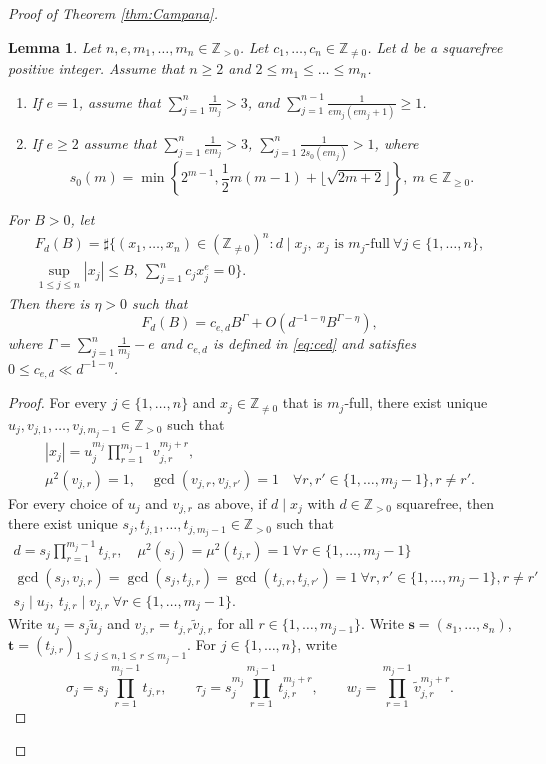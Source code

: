 \documentclass[10pt, a4paper, reqno, english]{amsart}
\newcommand\ZZ{\mathbb{Z}}
\newtheorem{lemma}[theorem]{Lemma}
\theoremstyle{definition}
\numberwithin{theorem}{section}
\numberwithin{equation}{section}
\begin{document}
\begin{proof}[Proof of Theorem \ref{thm:Campana}]
\begin{lemma}\label{lem:diagonal}
Let $n,e, m_1,\dots,m_n\in\ZZ_{>0}$. Let $c_1,\dots,c_n\in\ZZ_{\neq 0}$. Let $d$ be a squarefree positive integer. 
Assume that $n\geq 2$ and $2\leq m_1\leq \dots\leq m_n$.
\begin{enumerate}
\item If $e=1$, assume that $\sum_{j=1}^n\frac 1{m_j}>3$, and $\sum_{j=1}^{n-1}\frac 1{em_j(em_j+1)}\geq 1$. 
\item If $e\geq 2$ assume that $\sum_{j=1}^n\frac 1{em_j}>3$, $\sum_{j=1}^n\frac 1{2s_0(em_j)}>1$, where
$$
s_0(m)=\min\left\{2^{m-1},\frac 12m(m-1)+\lfloor\sqrt{2m+2}\rfloor\right\}, \ m\in\ZZ_{\geq0}.
$$
\end{enumerate}
For $B>0$, let
\begin{multline*}F_{d}(B)=\sharp\{(x_{1},\dots,x_{n})\in(\ZZ_{\neq 0})^{n}: 
	 d\mid x_{j}, \ 
	 x_{j} \text{ is } m_{j}\text{-full} \ \forall j\in\{1,\dots,n\}, \\
	 \sup_{1\leq j\leq n}|x_{j}|\leq B, \
	  \sum_{j=1}^{n} c_{j}x_{j}^{e}=0\}.
\end{multline*}
Then there is $\eta>0$ such that 
$$
F_{d}(B)=c_{e,d}B^\Gamma +O(d^{-1-\eta}B^{\Gamma-\eta}),
$$
where $\Gamma=\sum_{j=1}^n\frac 1{m_j}-e$ and $c_{e,d}$ is defined in \eqref{eq:ced} and satisfies $0\leq c_{e,d}\ll d^{-1-\eta}$.
\end{lemma}
\begin{proof}
For every $j\in\{1,\dots,n\}$ and $x_j\in\ZZ_{\neq 0}$ that is $m_j$-full,
there exist unique $u_j,v_{j,1},\dots,v_{j,m_j-1}\in\ZZ_{>0}$ such that 
\begin{gather*}
|x_j|=u_j^{m_j}\prod_{r=1}^{m_j-1}v_{j,r}^{m_j+r}, \\ \mu^2(v_{j,r})=1, \quad \gcd(v_{j,r},v_{j,r'})=1 \quad \forall r, r'\in\{1,\dots,m_j-1\}, r\neq r'.
\end{gather*}
For every choice of $u_j$ and $v_{j,r}$ as above, if $d\mid x_j$ with $d\in\ZZ_{> 0}$ squarefree, then there exist unique $s_j,t_{j,1},\dots,t_{j,m_j-1}\in\ZZ_{>0}$ such that 
\begin{gather*}
d=s_j\prod_{r=1}^{m_j-1}t_{j,r}, \quad
\mu^2(s_j)=\mu^2(t_{j,r})=1  \ \forall r\in\{1,\dots,m_j-1\} \\
\gcd(s_j,v_{j,r})=\gcd(s_j,t_{j,r})=\gcd(t_{j,r},t_{j,r'})=1 \ \forall r,r'\in\{1,\dots,m_j-1\}, r\neq r'\\
s_j\mid u_j, \ t_{j,r}\mid v_{j,r} \ \forall r\in\{1,\dots,m_j-1\}.
\end{gather*}
Write $u_j=s_j\tilde u_j$ and $v_{j,r}=t_{j,r}\tilde v_{j,r}$ for all $r\in\{1,\dots,m_{j-1}\}$. Write $\mathbf s=(s_1,\dots,s_n)$, $\mathbf t=(t_{j,r})_{1\leq j\leq n, 1\leq r\leq m_j-1}$. For $j\in\{1,\dots,n\}$, write 
$$\sigma_j=s_j\prod_{r=1}^{m_j-1}t_{j,r}, \qquad \tau_j= s_j^{m_j}\prod_{r=1}^{m_j-1}t_{j,r}^{m_j+r}, \qquad w_j=\prod_{r=1}^{m_j-1}\tilde v_{j,r}^{m_j+r}.$$


\end{proof}
\end{proof}
\end{document}
